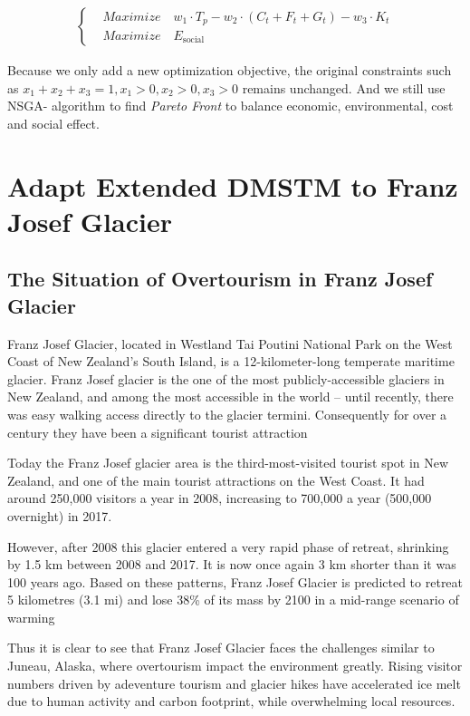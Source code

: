 \documentclass{mcmthesis}
\begin{document}
\begin{align}
\left\{
  \begin{aligned}
    & Maximize \quad w_1 \cdot T_p - w_2 \cdot (C_t + F_t + G_t) - w_3 \cdot K_t \\ 
    & Maximize \quad E_{\text{social}}
  \end{aligned}
\right.
\end{align}

Because we only add a new optimization objective, the original constraints such as $x_1+x_2+x_3=1, x_1>0,x_2>0,x_3>0$ 
remains unchanged. And we still use NSGA-\uppercase\expandafter{} algorithm to find
\emph{Pareto Front} to balance economic, environmental, cost and social effect.

\section{Adapt Extended DMSTM to Franz Josef Glacier}
\subsection{The Situation of Overtourism in Franz Josef Glacier}
Franz Josef Glacier, located in Westland Tai Poutini National Park on the West Coast of New Zealand's South Island, 
is a 12-kilometer-long temperate maritime glacier. Franz Josef glacier is the one of the most publicly-accessible glaciers in New Zealand,
and among the most accessible in the world -- until recently, there was easy walking access directly to the glacier termini. 
Consequently for over a century they have been a significant tourist attraction\cite{wilson2013west}

Today the Franz Josef glacier area is the third-most-visited tourist spot in New Zealand, 
and one of the main tourist attractions on the West Coast. It had around 250,000 visitors a year in 2008, 
increasing to 700,000 a year (500,000 overnight) in 2017.

However, after 2008 this glacier entered a very rapid phase of retreat, shrinking by 1.5 km between 2008 and 2017.
It is now once again 3 km shorter than it was 100 years ago. Based on these patterns, 
Franz Josef Glacier is predicted to retreat 5 kilometres (3.1 mi) and lose 38\% of its mass by 2100 in a mid-range scenario of warming\cite{anderson2008response}

Thus it is clear to see that Franz Josef Glacier faces the challenges similar to Juneau, Alaska, where overtourism 
impact the environment greatly. Rising visitor numbers driven by adeventure tourism and glacier hikes have accelerated ice melt
due to human activity and carbon footprint, while overwhelming local resources.
\end{document}
